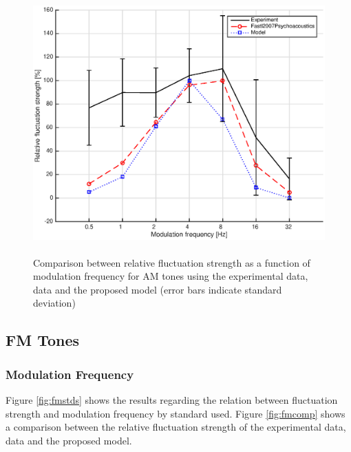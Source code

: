 \documentclass[a4paper]{article}
\begin{document}
\begin{figure}[ht]
    \centering
    \includegraphics[height=10cm]{img/AM_tones-fm-results-All-comparison}
    \caption{Comparison between relative fluctuation strength as a function of
        modulation frequency for AM tones using the experimental data,
        \citeauthor{Fastl2007Psychoacoustics} data and the proposed model
        (error bars indicate standard deviation)}
    \label{fig:amcomp}
\end{figure}

\subsection{FM Tones}

\subsubsection{Modulation Frequency}

Figure \ref{fig:fmstds} shows the results regarding the relation between
fluctuation strength and modulation frequency by standard used. Figure
\ref{fig:fmcomp} shows a comparison between the relative fluctuation strength
of the experimental data, \citeauthor{Fastl2007Psychoacoustics} data and the
proposed model.
\end{document}
